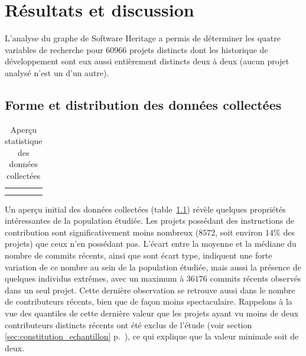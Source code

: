 \chapter{Résultats et discussion}
\label{chap:results}

\captionsetup[figure]{format=plain,singlelinecheck=true,justification=centering}
\captionsetup[subfigure]{format=plain,singlelinecheck=true,justification=centering}
\captionsetup[table]{format=plain,singlelinecheck=true,justification=centering}

L'analyse du graphe de Software Heritage a permis de déterminer les quatre variables de recherche pour
$60 966$ projets distincts dont les historique de développement sont eux aussi entièrement distincts deux à
deux (aucun projet analysé n'est un  d'un autre).

\section{Forme et distribution des données collectées}

\begin{table}[ht]
    \centering
    \begin{tabular}{cc}
         &
        
        \\
         &
        
    \end{tabular}
    \caption{Aperçu statistique des données collectées}
    \label{tab:data_description}
\end{table}

Un aperçu initial des données collectées (table~\ref{tab:data_description}) révèle quelques propriétés
intéressantes de la population étudiée. Les projets possédant des instructions de contribution sont
significativement moins nombreux ($8 572$, soit environ $14\%$ des projets) que ceux n'en possédant pas.
L'écart entre la moyenne et la médiane du nombre de \glspl{commit} récents, ainsi que sont écart type,
indiquent une forte variation de ce nombre au sein de la population étudiée, mais aussi la présence de
quelques individus extrêmes, avec un maximum à $36 176$ \glspl{commit} récents observés dans un seul projet.
Cette dernière observation se retrouve aussi dans le nombre de contributeurs récents, bien que de façon moins
spectaculaire. Rappelons à la vue des quantiles de cette dernière valeur que les projets ayant vu moins de
deux contributeurs distincts récents ont été exclus de l'étude (voir section
\ref{sec:constitution_echantillon} p.~\pageref{sec:constitution_echantillon}), ce qui explique que la valeur
minimale soit de deux.


